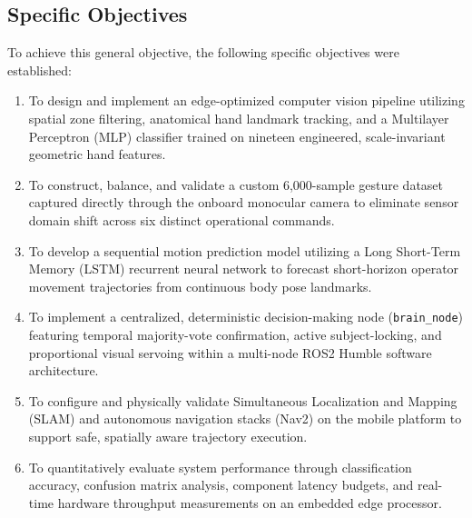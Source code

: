\subsection{Specific Objectives}
To achieve this general objective, the following specific objectives were established:
\begin{enumerate}
    \item To design and implement an edge-optimized computer vision pipeline utilizing spatial zone filtering, anatomical hand landmark tracking, and a Multilayer Perceptron (MLP) classifier trained on nineteen engineered, scale-invariant geometric hand features.
    \item To construct, balance, and validate a custom 6,000-sample gesture dataset captured directly through the onboard monocular camera to eliminate sensor domain shift across six distinct operational commands.
    \item To develop a sequential motion prediction model utilizing a Long Short-Term Memory (LSTM) recurrent neural network to forecast short-horizon operator movement trajectories from continuous body pose landmarks.
    \item To implement a centralized, deterministic decision-making node (\texttt{brain\_node}) featuring temporal majority-vote confirmation, active subject-locking, and proportional visual servoing within a multi-node ROS2 Humble software architecture.
    \item To configure and physically validate Simultaneous Localization and Mapping (SLAM) and autonomous navigation stacks (Nav2) on the mobile platform to support safe, spatially aware trajectory execution.
    \item To quantitatively evaluate system performance through classification accuracy, confusion matrix analysis, component latency budgets, and real-time hardware throughput measurements on an embedded edge processor.
\end{enumerate}

